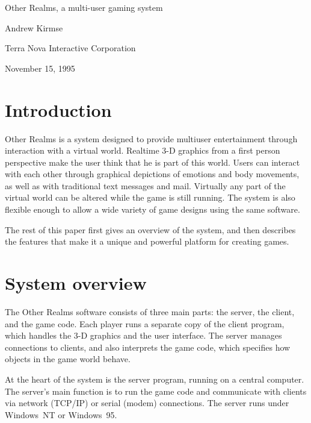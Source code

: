\documentclass[12pt]{article}
\begin{document}
\begin{center}
{\LARGE Other Realms, a multi-user gaming system}
\vspace{0.2in}

{\Large Andrew Kirmse}

\vspace{0.1in}

{\Large Terra Nova Interactive Corporation}

\vspace{0.1in}

{\Large November 15, 1995}
\end{center}


\section{Introduction}

Other Realms is a system designed to provide multiuser entertainment
through interaction with a virtual world.  Realtime 3-D graphics from
a first person perspective make the user think that he is part of this
world.  Users can interact with each other through graphical
depictions of emotions and body movements, as well as with traditional
text messages and mail.  Virtually any part of the virtual world can
be altered while the game is still running.  The system is also
flexible enough to allow a wide variety of game designs using the same
software.

The rest of this paper first gives an overview of the system, and then
describes the features that make it a unique and powerful platform
for creating games.

\section{System overview}

The Other Realms software consists of three main parts: the server,
the client, and the game code.  Each player runs a separate copy of
the client program, which handles the 3-D graphics and the user
interface.  The server manages connections to clients, and also
interprets the game code, which specifies how objects in the game
world behave.

At the heart of the system is the server program, running on a central
computer.  The server's main function is to run the game code and
communicate with clients via network (TCP/IP) or serial (modem)
connections.  The server runs under Windows~NT or Windows~95.
\end{document}
